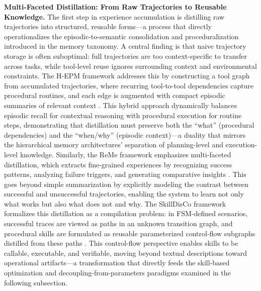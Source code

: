 \documentclass[11pt]{article}
\begin{document}
\textbf{Multi-Faceted Distillation: From Raw Trajectories to Reusable Knowledge.} The first step in experience accumulation is distilling raw trajectories into structured, reusable forms---a process that directly operationalizes the episodic-to-semantic consolidation and proceduralization introduced in the memory taxonomy. A central finding is that naive trajectory storage is often suboptimal: full trajectories are too context-specific to transfer across tasks, while tool-level reuse ignores surrounding context and environmental constraints. The H-EPM framework addresses this by constructing a tool graph from accumulated trajectories, where recurring tool-to-tool dependencies capture procedural routines, and each edge is augmented with compact episodic summaries of relevant context \cite{ref130}. This hybrid approach dynamically balances episodic recall for contextual reasoning with procedural execution for routine steps, demonstrating that distillation must preserve both the ``what'' (procedural dependencies) and the ``when/why'' (episodic context)---a duality that mirrors the hierarchical memory architectures' separation of planning-level and execution-level knowledge. Similarly, the ReMe framework emphasizes multi-faceted distillation, which extracts fine-grained experiences by recognizing success patterns, analyzing failure triggers, and generating comparative insights \cite{ref131}. This goes beyond simple summarization by explicitly modeling the contrast between successful and unsuccessful trajectories, enabling the system to learn not only what works but also what does not and why. The SkillDisCo framework formalizes this distillation as a compilation problem: in FSM-defined scenarios, successful traces are viewed as paths in an unknown transition graph, and procedural skills are formulated as reusable parameterized control-flow subgraphs distilled from these paths \cite{ref132}. This control-flow perspective enables skills to be callable, executable, and verifiable, moving beyond textual descriptions toward operational artifacts---a transformation that directly feeds the skill-based optimization and decoupling-from-parameters paradigms examined in the following subsection.
\end{document}
